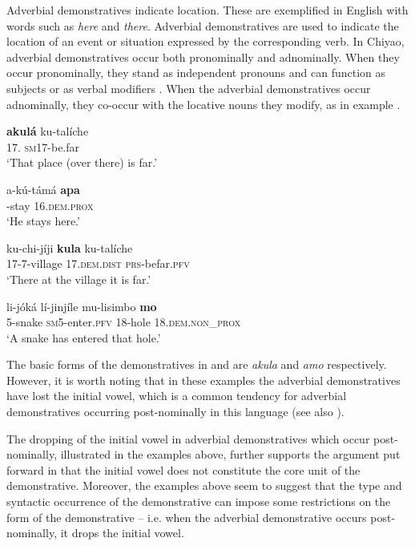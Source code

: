 \documentclass[output=paper,
            colorlinks, citecolor=brown
            ,draftmode
		  ]{langscibook}
\begin{document}
Adverbial demonstratives indicate location. These are exemplified in English with words such as \textit{here} and \textit{there}. Adverbial demonstratives are used to indicate the location of an event or situation expressed by the corresponding verb. In Chiyao, adverbial demonstratives occur both pronominally and adnominally. When they occur pronominally, they stand as independent pronouns and can function as subjects  or as verbal modifiers . When the adverbial demonstratives occur adnominally, they co-occur with the locative nouns they modify, as in example .

\ea%
    \label{ex:taji:15}
    \ea\label{ex:taji:15a}\gll \textbf{akulá}                  ku-talíche\\
      17.    \textsc{sm17}-be.far\\
      \glt ‘That place (over there) is far.’

  \ex\label{ex:taji:15b}\gll a-kú-támá              \textbf{apa}\\
      -stay      16.\textsc{dem.prox}\\
      \glt ‘He stays here.’
    \z

\ex%
    \label{ex:taji:16}
    \ea\label{ex:taji:16a} \gll ku-chi-jíji                  \textbf{kula}                      ku-talíche\\
  17-7-village                17.\textsc{dem.dist}      \textsc{prs}-befar.\textsc{pfv}\\
  \glt ‘There at the village it is far.’

   \ex\label{ex:taji:16b} \gll li-jóká        lí-jinjíle                  mu-lisimbo      \textbf{mo}\\
  5-snake        \textsc{sm5}-enter.\textsc{pfv}      18-hole              18.\textsc{dem.non\_prox}\\
  \glt ‘A snake has entered that hole.’
    \z
\z

The basic forms of the demonstratives in  and  are \textit{akula} and \textit{amo} respectively. However, it is worth noting that in these examples the adverbial demonstratives have lost the initial vowel, which is a common tendency for adverbial demonstratives occurring post-nominally in this language (see also ). 

The dropping of the initial vowel in adverbial demonstratives which occur post-nominally, illustrated in the examples above, further supports the argument put forward in  that the initial vowel does not constitute the core unit of the demonstrative. Moreover, the examples above seem to suggest that the type and syntactic occurrence of the demonstrative can impose some restrictions on the form of the demonstrative -- i.e. when the adverbial demonstrative occurs post-nominally, it drops the initial vowel.
\end{document}
